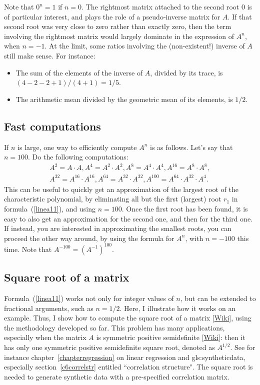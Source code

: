 \documentclass[oneside,10pt]{book}
\begin{document}
Note that $0^n=1$ if $n=0$. The rightmost matrix attached to the second root $0$ is of particular interest, and plays the role of a pseudo-inverse matrix for $A$. If that second root was very close to zero rather than exactly zero, then the term involving the rightmost matrix would largely dominate in the expression of $A^n$, when $n = -1$. At the limit, some ratios involving the (non-existent!) inverse of $A$ still make sense. For instance:
\begin{itemize}
\item The sum of the elements of the inverse of $A$, divided by its trace, is $(4 - 2 - 2 + 1) / (4 + 1) = 1 / 5$.
\item The arithmetic mean divided by the geometric mean of its elements, is $1 / 2$.
\end{itemize}

\subsection{Fast computations}

If $n$ is large, one way to efficiently compute $A^n$ is as follows. Let's say that $n = 100$. Do the following computations:
\begin{align*}
 A^2=A\cdot A, A^4 = A^2\cdot A^2, A^8=A^4\cdot A^4,A^{16}=A^8\cdot A^8, \\
A^{32}=A^{16}\cdot A^{16}, A^{64}=A^{32}\cdot A^{32}, A^{100}=A^{64}\cdot A^{32}\cdot A^4.
\end{align*}
\noindent This can be useful to quickly get an approximation of the largest root of the characteristic polynomial, by eliminating all but the first (largest) root $r_1$ in formula~(\ref{linea11}), and using $n = 100$. Once the first root has been found, it is easy to also get an approximation for the second one, and then for the third one. If instead, you are interested in approximating the smallest roots, you can proceed the other way around, by using the formula for $A^n$, with $n = -100$ this time. Note that $A^{-100}=(A^{-1})^{100}$.

\subsection{Square root of a matrix}

Formula~(\ref{linea11}) works not only for integer values of $n$, but can be extended to fractional arguments, such as $n=1/2$. Here, I illustrate how it works on an example. Thus, I show how to compute the \textcolor{index}{square root of a matrix} [\href{https://en.wikipedia.org/wiki/Square_root_of_a_matrix}{Wiki}], using the methodology developed so far. This problem has many applications, especially when the matrix $A$ is 
symmetric \textcolor{index}{positive semidefinite} [\href{https://en.wikipedia.org/wiki/Definite_matrix}{Wiki}]: then it has only one symmetric 
positive semidefinite square root, denoted as $A^{1/2}$. See for instance chapter~\ref{chapterregression} on linear regression and \gls{gls:syntheticdata}, especially section~\ref{c6correlstr} entitled ``correlation structure". The square root is needed to generate synthetic data with a pre-specified correlation matrix.
\end{document}
